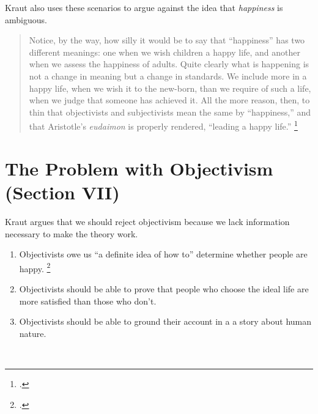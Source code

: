 \documentclass[12pt,letterpaper]{article}
\begin{document}
Kraut also uses these scenarios to argue against the idea that \textit{happiness} is ambiguous.

\begin{quote}
    Notice, by the way, how silly it would be to say that ``happiness'' has two different meanings: one when we wish children a happy life, and another when we assess the happiness of adults. Quite clearly what is happening is not a change in meaning but a change in standards. We include more in a happy life, when we wish it to the new-born, than we require of such a life, when we judge that someone has achieved it. All the more reason, then, to thin that objectivists and subjectivists mean the same by ``happiness,'' and that Aristotle's \textit{eudaimon} is properly rendered, ``leading a happy life.''%
    \footcite[][189]{two-conceptions-of-happiness-kraut-1979}
\end{quote}

\section*{The Problem with Objectivism (Section VII)}

Kraut argues that we should reject objectivism because we lack information necessary to make the theory work.

\begin{enumerate}
    \item Objectivists owe us ``a definite idea of how to'' determine whether people are happy.%
    \footcite[][189]{two-conceptions-of-happiness-kraut-1979}
    \item Objectivists should be able to prove that people who choose the ideal life are more satisfied than those who don't.
    \item Objectivists should be able to ground their account in a a story about human nature.
\end{enumerate}

\newpage\
\pagestyle{references}
\printbibliography[title={Bibliography}]
\end{document}
